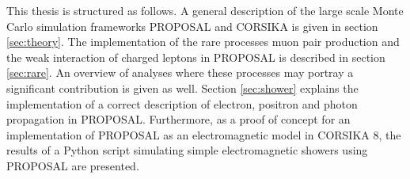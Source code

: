 This thesis is structured as follows.
A general description of the large scale Monte Carlo simulation frameworks PROPOSAL and CORSIKA is given in section \ref{sec:theory}.
The implementation of the rare processes muon pair production and the weak interaction of charged leptons in PROPOSAL is described in section \ref{sec:rare}.
An overview of analyses where these processes may portray a significant contribution is given as well.
Section \ref{sec:shower} explains the implementation of a correct description of electron, positron and photon propagation in PROPOSAL.
Furthermore, as a proof of concept for an implementation of PROPOSAL as an electromagnetic model in CORSIKA 8, the results of a Python script simulating simple electromagnetic showers using PROPOSAL are presented.